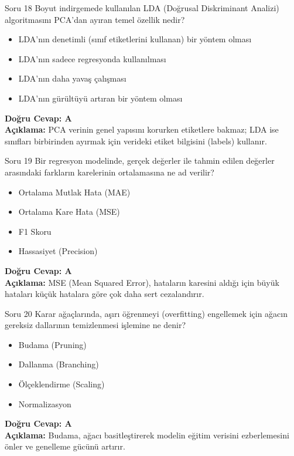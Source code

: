 \documentclass[12pt,a4paper]{article}
\begin{document}
\begin{testcard}{Soru 18}
    Boyut indirgemede kullanılan LDA (Doğrusal Diskriminant Analizi) algoritmasını PCA'dan ayıran temel özellik nedir?
    \begin{itemize}
        \item[A)] LDA'nın denetimli (sınıf etiketlerini kullanan) bir yöntem olması
        \item[B)] LDA'nın sadece regresyonda kullanılması
        \item[C)] LDA'nın daha yavaş çalışması
        \item[D)] LDA'nın gürültüyü artıran bir yöntem olması
    \end{itemize}
    \tcblower
    \textbf{Doğru Cevap: A} \\
    \textbf{Açıklama:} PCA verinin genel yapısını korurken etiketlere bakmaz; LDA ise sınıfları birbirinden ayırmak için verideki etiket bilgisini (labels) kullanır.
\end{testcard}

\begin{testcard}{Soru 19}
    Bir regresyon modelinde, gerçek değerler ile tahmin edilen değerler arasındaki farkların karelerinin ortalamasına ne ad verilir?
    \begin{itemize}
        \item[A)] Ortalama Mutlak Hata (MAE)
        \item[B)] Ortalama Kare Hata (MSE)
        \item[C)] F1 Skoru
        \item[D)] Hassasiyet (Precision)
    \end{itemize}
    \tcblower
    \textbf{Doğru Cevap: A} \\
    \textbf{Açıklama:} MSE (Mean Squared Error), hataların karesini aldığı için büyük hataları küçük hatalara göre çok daha sert cezalandırır.
\end{testcard}

\begin{testcard}{Soru 20}
    Karar ağaçlarında, aşırı öğrenmeyi (overfitting) engellemek için ağacın gereksiz dallarının temizlenmesi işlemine ne denir?
    \begin{itemize}
        \item[A)] Budama (Pruning)
        \item[B)] Dallanma (Branching)
        \item[C)] Ölçeklendirme (Scaling)
        \item[D)] Normalizasyon
    \end{itemize}
    \tcblower
    \textbf{Doğru Cevap: A} \\
    \textbf{Açıklama:} Budama, ağacı basitleştirerek modelin eğitim verisini ezberlemesini önler ve genelleme gücünü artırır.
\end{testcard}
\end{document}
